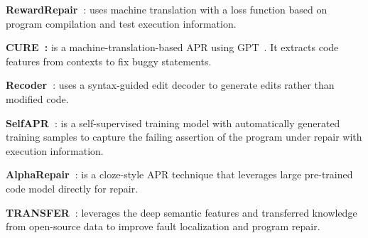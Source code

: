 
{\bf RewardRepair~\cite{monperrus-icse22}}: uses machine translation
with a loss function based on program compilation and test execution
information.




{\bf CURE~\cite{cure-icse21}:} is a machine-translation-based APR
using GPT~\cite{radford2018improving}.
It extracts code features from contexts to fix buggy statements.





{\bf Recoder~\cite{recoder-fse21}}: uses a syntax-guided edit decoder
to generate edits rather than modified code.

{\bf SelfAPR~\cite{ye2022selfapr}}: is a self-supervised training model with automatically generated training samples to capture the failing assertion of the program under repair with execution information.

{\bf AlphaRepair~\cite{xia2022less}}: is a cloze-style APR technique that leverages large pre-trained code model directly for
repair.

{\bf TRANSFER~\cite{meng2022improving}}: leverages the deep semantic features and transferred knowledge from open-source data to improve fault localization and program repair.

